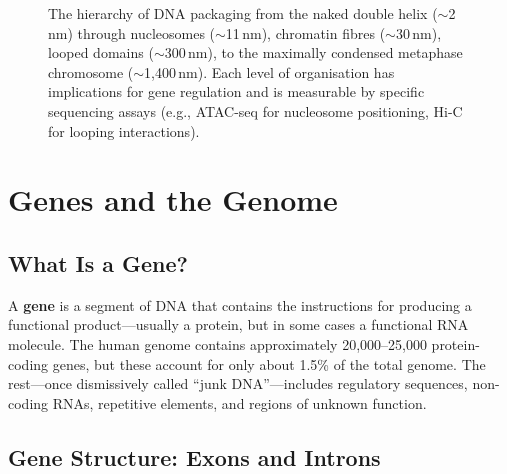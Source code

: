 \begin{figure}[htbp]
\caption[Chromatin organisation hierarchy.]{The hierarchy of DNA packaging from the naked double helix ($\sim$2\,nm) through nucleosomes ($\sim$11\,nm), chromatin fibres ($\sim$30\,nm), looped domains ($\sim$300\,nm), to the maximally condensed metaphase chromosome ($\sim$1,400\,nm). Each level of organisation has implications for gene regulation and is measurable by specific sequencing assays (e.g., \acrshort{ATAC-seq} for nucleosome positioning, \acrshort{Hi-C} for looping interactions).}
\label{fig:molbio:chromatin-hierarchy}
\end{figure}


\section{Genes and the Genome}
\label{sec:molbio:genes-genome}

\subsection{What Is a Gene?}
\label{subsec:molbio:gene-definition}

A \textbf{gene} is a segment of DNA that contains the instructions for producing a functional product---usually a protein, but in some cases a functional RNA molecule. The human genome contains approximately 20,000--25,000 protein-coding genes, but these account for only about 1.5\% of the total genome. The rest---once dismissively called ``junk DNA''---includes regulatory sequences, non-coding RNAs, repetitive elements, and regions of unknown function.

\subsection{Gene Structure: Exons and Introns}
\label{subsec:molbio:exons-introns}

